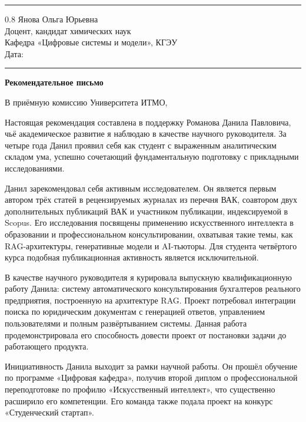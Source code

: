 \documentclass[a4paper,12pt]{article}
\begin{document}
\vspace{4pt}
\noindent\rule{\textwidth}{0.8pt}

\begin{flushright}
  \begin{spacing}{0.8}
    Янова Ольга Юрьевна\\
    Доцент, кандидат химических наук\\
    Кафедра «Цифровые системы и модели», КГЭУ\\[6pt]
    Дата: \rule{4cm}{0.4pt}
  \end{spacing}
\end{flushright}

\begin{center}
  {\Large\bfseries Рекомендательное письмо}
\end{center}

В приёмную комиссию Университета ИТМО,

Настоящая рекомендация составлена в поддержку Романова Данила Павловича, чьё академическое развитие я наблюдаю в качестве научного руководителя. За четыре года Данил проявил себя как студент с выраженным аналитическим складом ума, успешно сочетающий фундаментальную подготовку с прикладными исследованиями.

Данил зарекомендовал себя активным исследователем. Он является первым автором трёх статей в рецензируемых журналах из перечня ВАК, соавтором двух дополнительных публикаций ВАК и участником публикации, индексируемой в Scopus. Его исследования посвящены применению искусственного интеллекта в образовании и профессиональном консультировании, охватывая такие темы, как RAG-архитектуры, генеративные модели и AI-тьюторы. Для студента четвёртого курса подобная публикационная активность является исключительной.

В качестве научного руководителя я курировала выпускную квалификационную работу Данила: систему автоматического консультирования бухгалтеров реального предприятия, построенную на архитектуре RAG. Проект потребовал интеграции поиска по юридическим документам с генерацией ответов, управлением пользователями и полным развёртыванием системы. Данная работа продемонстрировала его способность довести проект от постановки задачи до работающего продукта.

Инициативность Данила выходит за рамки научной работы. Он прошёл обучение по программе «Цифровая кафедра», получив второй диплом о профессиональной переподготовке по профилю «Искусственный интеллект», что существенно расширило его компетенции. Его команда также подала проект на конкурс «Студенческий стартап».
\end{document}
